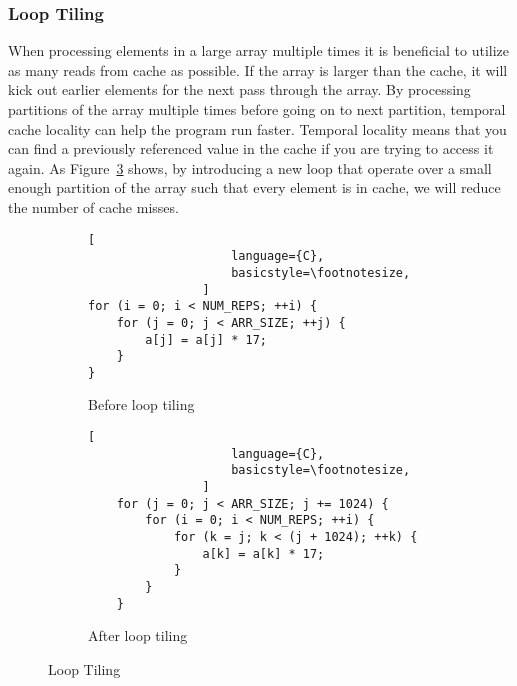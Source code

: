 \subsubsection{Loop Tiling}
When processing elements in a large array multiple times it is beneficial to utilize as many reads from cache as possible. If the array is larger than the cache, it will kick out earlier elements for the next pass through the array. By processing partitions of the array multiple times before going on to next partition, temporal cache locality can help the program run faster. Temporal locality means that you can find a previously referenced value in the cache if you are trying to access it again. As Figure~\ref{fig:loop:tiling} shows, by introducing a new loop that operate over a small enough partition of the array such that every element is in cache, we will reduce the number of cache misses.

\begin{figure}[h]
    \begin{adjustbox}{minipage=\linewidth,scale=0.8}
        \begin{subfigure}{.50\textwidth}
            \centering
            \begin{lstlisting}[
                    language={C},
                    basicstyle=\footnotesize,
                ]
for (i = 0; i < NUM_REPS; ++i) {
    for (j = 0; j < ARR_SIZE; ++j) {
        a[j] = a[j] * 17;
    }
}
                \end{lstlisting}
            \caption{Before loop tiling}
            \label{fig:tiling:sub1}
        \end{subfigure}%
        \begin{subfigure}{.50\textwidth}
            \centering
            \begin{lstlisting}[
                    language={C},
                    basicstyle=\footnotesize,
                ]
    for (j = 0; j < ARR_SIZE; j += 1024) {
        for (i = 0; i < NUM_REPS; ++i) {
            for (k = j; k < (j + 1024); ++k) {
                a[k] = a[k] * 17;
            }
        }
    }
                \end{lstlisting}
            \caption{After loop tiling}
            \label{fig:tiling:sub2}
        \end{subfigure}
    \end{adjustbox}
    \caption{Loop Tiling}
    \label{fig:loop:tiling}
\end{figure}



